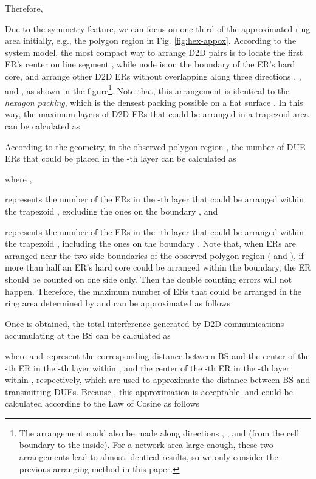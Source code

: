 \documentclass[journal, 10pt]{IEEEtran}
\begin{document}
Therefore, 


Due to  the symmetry feature, we can focus on one third of the approximated ring 
area initially, e.g., the polygon region  in Fig. \ref{fig:hex-appox}. 
According to the system model, the most compact way to arrange D2D pairs 
is to locate the first ER's center on line segment , while node  
is on the boundary of the ER's hard core, and arrange other D2D ERs 
without overlapping along three directions , , and , 
as shown in the 
figure\footnote{The arrangement could also be made along directions
, , and  (from the cell boundary to the
inside). For a network area large enough, these two arrangements lead
to almost identical results, so we only consider the previous
arranging method in this paper.}. 
Note that, this arrangement is identical to the 
\emph{hexagon packing}, which is the densest packing possible on a flat 
surface \cite{Stephenson:03circlepacking}. In this way, the maximum layers 
of D2D ERs that could be arranged in a trapezoid area can be calculated as 

According to the geometry, in the observed polygon region , the 
number of DUE ERs that could be placed in the -th layer can be calculated as

where ,  

represents the number of the ERs in the -th layer that could be
arranged within the trapezoid , excluding the ones on the
boundary , and

represents the number of the ERs in the -th layer that could be
arranged within the trapezoid , including the ones on the
boundary . Note that, when ERs are arranged near the two side
boundaries of the observed polygon region ( and ), if more
than half an ER's hard core could be arranged within the boundary, the
ER should be counted on one side only. Then the double counting errors
will not happen. 
Therefore, the maximum number of ERs that could be arranged in the ring 
area determined by  and  can be approximated 
as follows


Once  is obtained, the total interference generated 
by D2D communications accumulating at the BS can be calculated as

where  and  represent the corresponding distance between 
BS and the center of the -th ER in the -th layer within 
, and the center of the -th ER in the -th layer within , 
respectively, which are used to approximate the distance between BS 
and transmitting DUEs. Because , 
this approximation is acceptable.  and  could be calculated 
according to the Law of Cosine as follows
\setlength{\arraycolsep}{0.14em}
\end{document}
